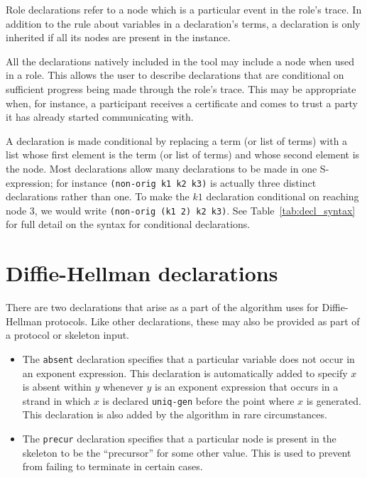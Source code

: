 Role declarations refer to a node which is a particular event in the
role's trace.  In addition to the rule about variables in a
declaration's terms, a declaration is only inherited if all its nodes
are present in the instance.

 All the declarations natively
included in the tool may include a node when used in a role.  This
allows the user to describe declarations that are conditional on
sufficient progress being made through the role's trace.  This may
be appropriate when, for instance, a participant receives a certificate
and comes to trust a party it has already started communicating with.

A declaration is made conditional by replacing a term (or list of
terms) with a list whose first element is the term (or list of terms)
and whose second element is the node.  Most {\cpsa} declarations allow
many declarations to be made in one S-expression; for instance
\texttt{(non-orig k1 k2 k3)} is actually three distinct declarations
rather than one.  To make the $k1$ declaration conditional on reaching
node 3, we would write \texttt{(non-orig (k1 2) k2 k3)}.  See
Table~\ref{tab:decl_syntax} for full detail on the syntax for
conditional declarations.

\section{Diffie-Hellman declarations}
There are two declarations that arise as a part of the algorithm
{\cpsa} uses for Diffie-Hellman protocols.  Like other declarations,
these may also be provided as part of a protocol or skeleton input.

\begin{itemize}

  \item {} The \texttt{absent} declaration specifies
  that a particular  variable does not occur in an %
  exponent expression.  This declaration is automatically added to
  specify $x$ is absent within $y$ whenever $y$ is an %
  exponent expression that occurs in a strand in which $x$ is declared
  \texttt{uniq-gen} before the point where $x$ is generated.  This
  declaration is also added by the algorithm in rare circumstances.

  \item {} The \texttt{precur} declaration specifies
    that a particular node is present in the skeleton to be the
    ``precursor'' for some other value.  This is used to prevent
    {\cpsa} from failing to terminate in certain cases.
\end{itemize}

